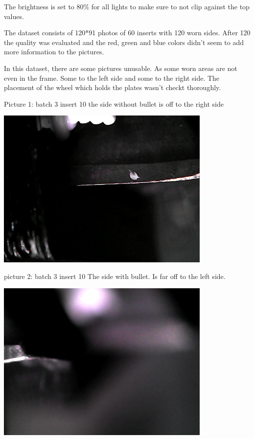 The brightness is set to 80\% for all lights to make sure to not clip against the top values.



The dataset consists of 120*91 photos of 60 inserts with 120 worn sides. After 120 the quality was evaluated and the red, green and blue colors didn't seem to add more information to the pictures. 



In this dataset, there are some pictures unusable. As some worn areas are not even in the frame. Some to the left side and some to the right side. The placement of the wheel which holds the plates wasn't checkt thoroughly.

Picture 1: batch 3 insert 10 the side without bullet is off to the right side 

\includegraphics[width=4.166667in, keepaspectratio=true]{./fig/Vision/Dataset/automated_datasets/2_created_datasets/1_Birthday_dataset/b_003_p_010_l_000_nb.png}

picture 2: batch 3 insert 10 The side with bullet. Is far off to the left side.

\includegraphics[width=4.166667in, keepaspectratio=true]{./fig/Vision/Dataset/automated_datasets/2_created_datasets/1_Birthday_dataset/b_003_p_010_l_000_b.png}



